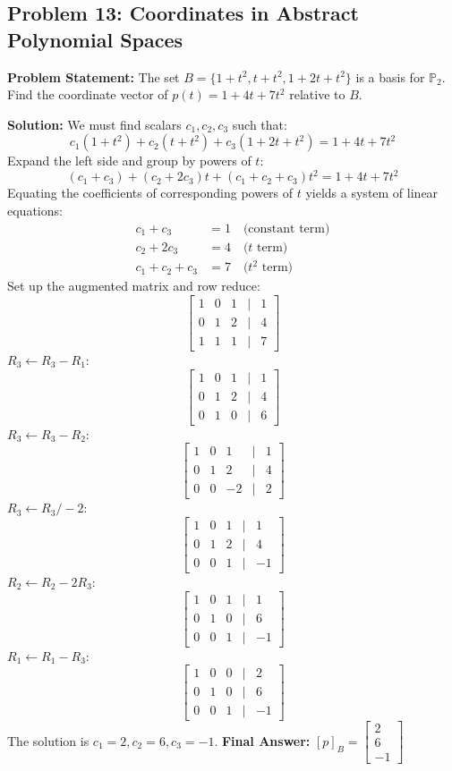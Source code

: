 \documentclass[11pt]{article}
\begin{document}
\subsection{Problem 13: Coordinates in Abstract Polynomial Spaces}
\textbf{Problem Statement:} The set $B = \{1+t^2, t+t^2, 1+2t+t^2\}$ is a basis for $\mathbb{P}_2$. Find the coordinate vector of $p(t) = 1+4t+7t^2$ relative to $B$.

\textbf{Solution:}
We must find scalars $c_1, c_2, c_3$ such that:
\[ c_1(1+t^2) + c_2(t+t^2) + c_3(1+2t+t^2) = 1+4t+7t^2 \]
Expand the left side and group by powers of $t$:
\[ (c_1 + c_3) + (c_2 + 2c_3)t + (c_1 + c_2 + c_3)t^2 = 1 + 4t + 7t^2 \]
Equating the coefficients of corresponding powers of $t$ yields a system of linear equations:
\begin{align*}
c_1 + c_3 &= 1 \quad \text{(constant term)} \\
c_2 + 2c_3 &= 4 \quad \text{($t$ term)} \\
c_1 + c_2 + c_3 &= 7 \quad \text{($t^2$ term)}
\end{align*}
Set up the augmented matrix and row reduce:
\[ \begin{bmatrix} 1 & 0 & 1 & | & 1 \\ 0 & 1 & 2 & | & 4 \\ 1 & 1 & 1 & | & 7 \end{bmatrix} \]
$R_3 \leftarrow R_3 - R_1$:
\[ \begin{bmatrix} 1 & 0 & 1 & | & 1 \\ 0 & 1 & 2 & | & 4 \\ 0 & 1 & 0 & | & 6 \end{bmatrix} \]
$R_3 \leftarrow R_3 - R_2$:
\[ \begin{bmatrix} 1 & 0 & 1 & | & 1 \\ 0 & 1 & 2 & | & 4 \\ 0 & 0 & -2 & | & 2 \end{bmatrix} \]
$R_3 \leftarrow R_3 / -2$:
\[ \begin{bmatrix} 1 & 0 & 1 & | & 1 \\ 0 & 1 & 2 & | & 4 \\ 0 & 0 & 1 & | & -1 \end{bmatrix} \]
$R_2 \leftarrow R_2 - 2R_3$:
\[ \begin{bmatrix} 1 & 0 & 1 & | & 1 \\ 0 & 1 & 0 & | & 6 \\ 0 & 0 & 1 & | & -1 \end{bmatrix} \]
$R_1 \leftarrow R_1 - R_3$:
\[ \begin{bmatrix} 1 & 0 & 0 & | & 2 \\ 0 & 1 & 0 & | & 6 \\ 0 & 0 & 1 & | & -1 \end{bmatrix} \]
The solution is $c_1 = 2, c_2 = 6, c_3 = -1$.
\textbf{Final Answer:} $[p]_B = \begin{bmatrix} 2 \\ 6 \\ -1 \end{bmatrix}$
\end{document}
